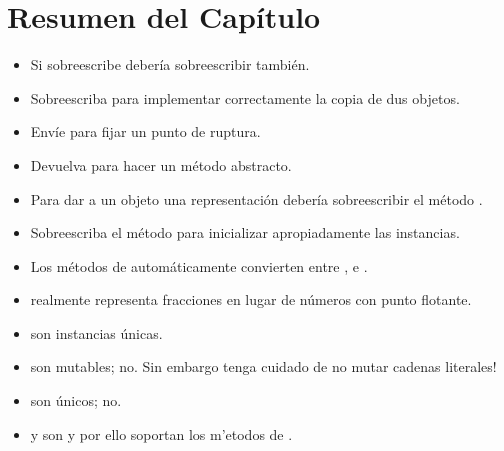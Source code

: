 \documentclass[a4paper,10pt,twoside]{book}
\begin{document}

\section{Resumen del Cap\'itulo}

\begin{itemize}

  \item Si sobreescribe \ct{=} deber\'ia sobreescribir  tambi\'en.

  \item Sobreescriba  para implementar correctamente la copia de dus objetos.

  \item Env\'ie  para fijar un punto de ruptura.

  \item Devuelva  para hacer un m\'etodo abstracto.

  \item Para dar a un objeto una representaci\'on  deber\'ia sobreescribir el m\'etodo .

  \item Sobreescriba el m\'etodo  para inicializar apropiadamente las instancias.

  \item Los m\'etodos de  autom\'aticamente convierten entre  ,  e .

  \item {} realmente representa fracciones en lugar de n\'umeros con punto flotante.

  \item {} son instancias \'unicas.

  \item {} son mutables;  no.
  Sin embargo tenga cuidado de no mutar cadenas literales!

  \item {} son \'unicos;  no.

  \item {} y  son  y por ello soportan los m'etodos de .

\end{itemize}

\ifx\wholebook\relax\else
   
   
\end{document}
